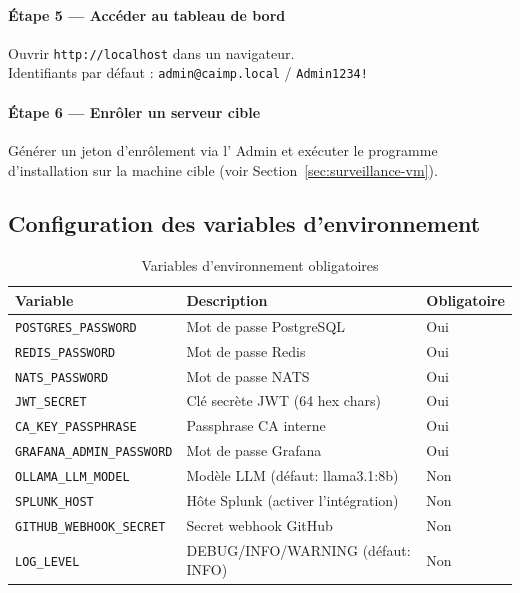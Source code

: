 \paragraph{Étape 5 — Accéder au tableau de bord}
Ouvrir \texttt{http://localhost} dans un navigateur.\\
Identifiants par défaut : \texttt{admin@caimp.local} / \texttt{Admin1234!}

\paragraph{Étape 6 — Enrôler un serveur cible}
Générer un jeton d'enrôlement via l'\api{} Admin et exécuter le programme
d'installation sur la machine cible (voir Section~\ref{sec:surveillance-vm}).

\subsection{Configuration des variables d'environnement}

\begin{table}[H]
\centering
\caption{Variables d'environnement obligatoires}
\label{tab:env-vars}
\small
\begin{tabularx}{\textwidth}{lXl}
\toprule
\textbf{Variable} & \textbf{Description} & \textbf{Obligatoire} \\
\midrule
\texttt{POSTGRES\_PASSWORD}    & Mot de passe PostgreSQL        & Oui \\
\texttt{REDIS\_PASSWORD}       & Mot de passe Redis             & Oui \\
\texttt{NATS\_PASSWORD}        & Mot de passe NATS              & Oui \\
\texttt{JWT\_SECRET}           & Clé secrète JWT (64 hex chars) & Oui \\
\texttt{CA\_KEY\_PASSPHRASE}   & Passphrase CA interne          & Oui \\
\texttt{GRAFANA\_ADMIN\_PASSWORD} & Mot de passe Grafana       & Oui \\
\texttt{OLLAMA\_LLM\_MODEL}    & Modèle LLM (défaut: llama3.1:8b) & Non \\
\texttt{SPLUNK\_HOST}          & Hôte Splunk (activer l'intégration) & Non \\
\texttt{GITHUB\_WEBHOOK\_SECRET} & Secret webhook GitHub       & Non \\
\texttt{LOG\_LEVEL}            & DEBUG/INFO/WARNING (défaut: INFO) & Non \\
\bottomrule
\end{tabularx}
\end{table}

